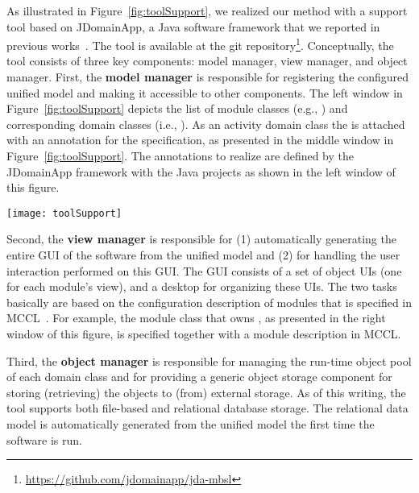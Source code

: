 
As illustrated in Figure~\ref{fig:toolSupport}, we realized our method with a support tool based on JDomainApp, a Java software framework that we reported in previous works~\cite{le_domain_2018}. The tool is available at the git repository\footnote{\url{https://github.com/jdomainapp/jda-mbsl}}. %
%
Conceptually, the tool consists of three key components: model manager, view manager, and object manager. First, the \textbf{model manager} is responsible for registering the configured unified model and making it accessible to other components. The left window in Figure~\ref{fig:toolSupport} depicts the list of module classes (e.g., ) and corresponding domain classes (i.e., ). As an activity domain class the  is attached with an annotation  for the \agl specification, as presented in the middle window in Figure~\ref{fig:toolSupport}. The annotations to realize \agl are defined by the JDomainApp framework with the Java projects as shown in the left window of this figure. 

\begin{figure*}[ht]
	\centering
	\texttt{[image: toolSupport]}
	\caption{Illustration for the JDomainApp-based realization and usability of \agl.} %
	\vspace{-0.2cm}
	\label{fig:toolSupport}
\end{figure*}

Second, the \textbf{view manager} is responsible for (1) automatically generating the entire GUI of the software from the unified model and (2) for handling the user interaction performed on this GUI. The GUI consists of a set of object UIs (one for each module's view), and a desktop for organizing these UIs. The two tasks basically are based on the configuration description of modules that is specified in MCCL~\cite{le_domain_2018}. For example, the module class  that owns , as presented in the right window of this figure, is specified together with a module description in MCCL.

Third, the \textbf{object manager} is responsible for managing the run-time object pool of each domain class and for providing a generic object storage component for storing (retrieving) the objects to (from) external storage. As of this writing, the tool supports both file-based and relational database storage. The relational data model is automatically generated from the unified model the first time the software is run.

